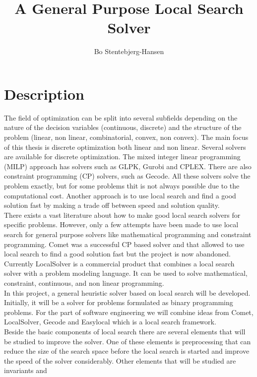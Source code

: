 \documentclass[a4paper,11pt]{article}
\title{A General Purpose Local Search Solver }
\author{Bo Stentebjerg-Hansen}
\begin{document}
\maketitle

\section*{Description}
The field of optimization can be split into several subfields depending on the nature of the decision variables 
(continuous, discrete) and the structure of the problem (linear, non linear, combinatorial, convex, non 
convex). The main focus of this thesis is discrete optimization both linear and non linear. 
Several solvers are available for discrete optimization. The mixed integer linear programming (MILP) approach has 
solvers such as GLPK, Gurobi and CPLEX. There are also constraint programming (CP) solvers, such as Gecode. All these 
solvers solve the problem exactly, but for some problems thit is not always possible due to the computational 
cost. Another approach is to use local search and find a good solution fast by making a trade off between speed 
and solution quality. \medskip \\ 
There exists a vast literature about how to make good local search solvers for specific problems.
However, only a few attempts have been made to use local search for general purpose solvers like 
mathematical programming and constraint programming. Comet was a successful CP based solver and that allowed to 
use local search to find a good solution fast but the project is now abandoned. Currently LocalSolver is a commercial 
product that combines a local search solver with a problem modeling language. It can be used to solve mathematical, 
constraint, continuous, and non linear programming. \medskip \\
In this project, a general heuristic solver based on local search will be developed. Initially, it will be a solver 
for problems formulated as binary programming problems. For the part of 
software engineering we will combine ideas from Comet, LocalSolver, Gecode and Easylocal which is a local search 
framework.  \medskip \\
Beside the basic components of local search there are several elements that will be studied to improve the 
solver. One of these elements is preprocessing that can reduce the size of the search space before the local search is 
started and improve the speed of the solver considerably. Other elements that will be studied are invariants and 
\end{document}
